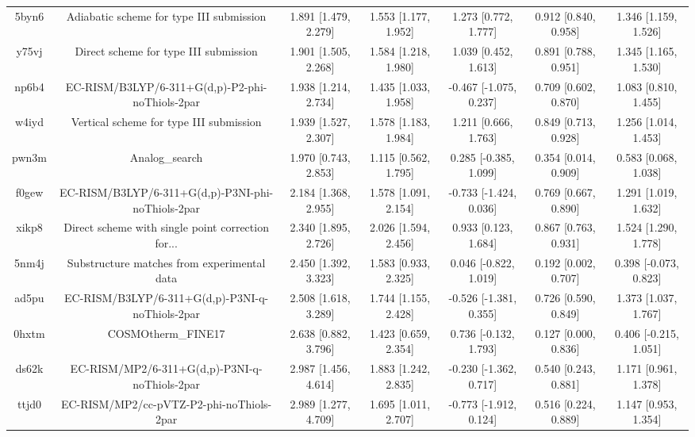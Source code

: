 \documentclass{article}
\begin{document}
\begin{center}
\begin{longtable}{|ccccccc|}
 5byn6 &           Adiabatic scheme for type III submission &  1.891 [1.479, 2.279] &  1.553 [1.177, 1.952] &     1.273 [0.772, 1.777] &  0.912 [0.840, 0.958] &   1.346 [1.159, 1.526] \\
 y75vj &              Direct scheme for type III submission &  1.901 [1.505, 2.268] &  1.584 [1.218, 1.980] &     1.039 [0.452, 1.613] &  0.891 [0.788, 0.951] &   1.345 [1.165, 1.530] \\
 np6b4 &    EC-RISM/B3LYP/6-311+G(d,p)-P2-phi-noThiols-2par &  1.938 [1.214, 2.734] &  1.435 [1.033, 1.958] &   -0.467 [-1.075, 0.237] &  0.709 [0.602, 0.870] &   1.083 [0.810, 1.455] \\
 w4iyd &            Vertical scheme for type III submission &  1.939 [1.527, 2.307] &  1.578 [1.183, 1.984] &     1.211 [0.666, 1.763] &  0.849 [0.713, 0.928] &   1.256 [1.014, 1.453] \\
 pwn3m &                                     Analog\_search &  1.970 [0.743, 2.853] &  1.115 [0.562, 1.795] &    0.285 [-0.385, 1.099] &  0.354 [0.014, 0.909] &   0.583 [0.068, 1.038] \\
 f0gew &  EC-RISM/B3LYP/6-311+G(d,p)-P3NI-phi-noThiols-2par &  2.184 [1.368, 2.955] &  1.578 [1.091, 2.154] &   -0.733 [-1.424, 0.036] &  0.769 [0.667, 0.890] &   1.291 [1.019, 1.632] \\
 xikp8 &  Direct scheme with single point correction for... &  2.340 [1.895, 2.726] &  2.026 [1.594, 2.456] &     0.933 [0.123, 1.684] &  0.867 [0.763, 0.931] &   1.524 [1.290, 1.778] \\
 5nm4j &        Substructure matches from experimental data &  2.450 [1.392, 3.323] &  1.583 [0.933, 2.325] &    0.046 [-0.822, 1.019] &  0.192 [0.002, 0.707] &  0.398 [-0.073, 0.823] \\
 ad5pu &    EC-RISM/B3LYP/6-311+G(d,p)-P3NI-q-noThiols-2par &  2.508 [1.618, 3.289] &  1.744 [1.155, 2.428] &   -0.526 [-1.381, 0.355] &  0.726 [0.590, 0.849] &   1.373 [1.037, 1.767] \\
 0hxtm &                                 COSMOtherm\_FINE17 &  2.638 [0.882, 3.796] &  1.423 [0.659, 2.354] &    0.736 [-0.132, 1.793] &  0.127 [0.000, 0.836] &  0.406 [-0.215, 1.051] \\
 ds62k &      EC-RISM/MP2/6-311+G(d,p)-P3NI-q-noThiols-2par &  2.987 [1.456, 4.614] &  1.883 [1.242, 2.835] &   -0.230 [-1.362, 0.717] &  0.540 [0.243, 0.881] &   1.171 [0.961, 1.378] \\
 ttjd0 &           EC-RISM/MP2/cc-pVTZ-P2-phi-noThiols-2par &  2.989 [1.277, 4.709] &  1.695 [1.011, 2.707] &   -0.773 [-1.912, 0.124] &  0.516 [0.224, 0.889] &   1.147 [0.953, 1.354] \\

\end{longtable}
\end{center}
\end{document}
